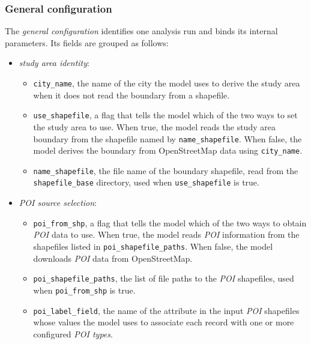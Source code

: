 \documentclass{article}
\begin{document}
\subsubsection*{General configuration}
The \emph{general configuration} identifies one analysis run and binds its internal parameters. Its fields are grouped as follows:
\begin{itemize}
    \item \emph{study area identity}:
    \begin{itemize}
        \item \texttt{city\_name}, the name of the city the model uses to derive the study area when it does not read the boundary from a shapefile.
        \item \texttt{use\_shapefile}, a flag that tells the model which of the two ways to set the study area to use. When true, the model reads the study area boundary from the shapefile named by \texttt{name\_\allowbreak shapefile}. When false, the model derives the boundary from OpenStreetMap data using \texttt{city\_name}.
        \item \texttt{name\_shapefile}, the file name of the boundary shapefile, read from the \texttt{shapefile\_\allowbreak base} directory, used when \texttt{use\_\allowbreak shapefile} is true.
    \end{itemize}

    \item \emph{POI source selection}:
    \begin{itemize}
        \item \texttt{poi\_from\_shp}, a flag that tells the model which of the two ways to obtain \emph{POI} data to use. When true, the model reads \emph{POI} information from the shapefiles listed in \texttt{poi\_shapefile\_paths}. When false, the model downloads \emph{POI} data from OpenStreetMap.
        \item \texttt{poi\_shapefile\_paths}, the list of file paths to the \emph{POI}
        shapefiles, used when \texttt{poi\_from\_shp} is true.
        \item \texttt{poi\_label\_field}, the name of the attribute in the input \emph{POI}
        shapefiles whose values the model uses to associate each record with one or
        more configured \emph{POI types}.
    \end{itemize}


\end{itemize}
\end{document}
